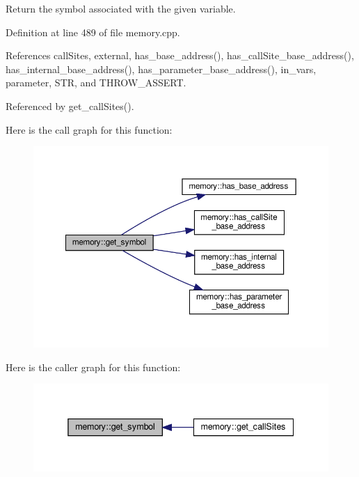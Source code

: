 Return the symbol associated with the given variable. 



Definition at line 489 of file memory.\+cpp.



References call\+Sites, external, has\+\_\+base\+\_\+address(), has\+\_\+call\+Site\+\_\+base\+\_\+address(), has\+\_\+internal\+\_\+base\+\_\+address(), has\+\_\+parameter\+\_\+base\+\_\+address(), in\+\_\+vars, parameter, S\+TR, and T\+H\+R\+O\+W\+\_\+\+A\+S\+S\+E\+RT.



Referenced by get\+\_\+call\+Sites().

Here is the call graph for this function\+:
\nopagebreak
\begin{figure}[H]
\begin{center}
\leavevmode
\includegraphics[width=350pt]{d8/d99/classmemory_a380db560791ad488411a1d16c0526e43_cgraph}
\end{center}
\end{figure}
Here is the caller graph for this function\+:
\nopagebreak
\begin{figure}[H]
\begin{center}
\leavevmode
\includegraphics[width=338pt]{d8/d99/classmemory_a380db560791ad488411a1d16c0526e43_icgraph}
\end{center}
\end{figure}
\mbox{\label{classmemory_abf339e7c5e5b888f1dfd5927f8750497}} 

